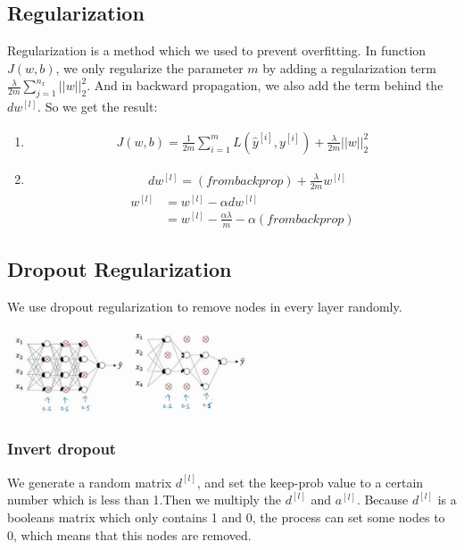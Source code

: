 \documentclass{article}
\begin{document}
\subsection{Regularization}
Regularization is a method which we used to prevent overfitting. In function $J(w,b)$, we only regularize the parameter $m$ by adding a regularization term $\frac{\lambda}{2m}\sum\limits_{j= 1}^{n_{x}}{||w||_2^2}$. And in backward propagation, we also add the term behind the $dw^{[l]}$. So we get the result:
\begin{enumerate}
\item 
\begin{align*}
J(w,b)=\frac{1}{2m}\sum\limits_{i=1}^{m}L(\hat{y}^{[i]},y^{[i]})+\frac{\lambda}{2m}||w||^2_2
\end{align*}
\item 
\begin{align*}
&dw^{[l]}=(from backprop)+\frac{\lambda}{2m}w^{[l]}
\end{align*}
\begin{align*}
w^{[l]}&=w^{[l]}-\alpha dw^{[l]}\\
&=w^{[l]}-\frac{\alpha \lambda}{m}-\alpha (from backprop)
\end{align*}

\end{enumerate}


\subsection{Dropout Regularization}
We use dropout regularization to remove nodes in every layer randomly.

\includegraphics[width=3.5cm]{dropout1.png}
\includegraphics[width=3.5cm]{dropout2.png}

\subsubsection{Invert dropout}
We generate a random matrix $d^{[l]}$, and set the keep-prob value to a certain number which is less than 1.Then we multiply the $d^{[l]}$ and $a^{[l]}$. Because $d^{[l]}$ is a booleans matrix which only contains 1 and 0, the process can set some nodes to 0, which means that this nodes are removed.
\end{document}
